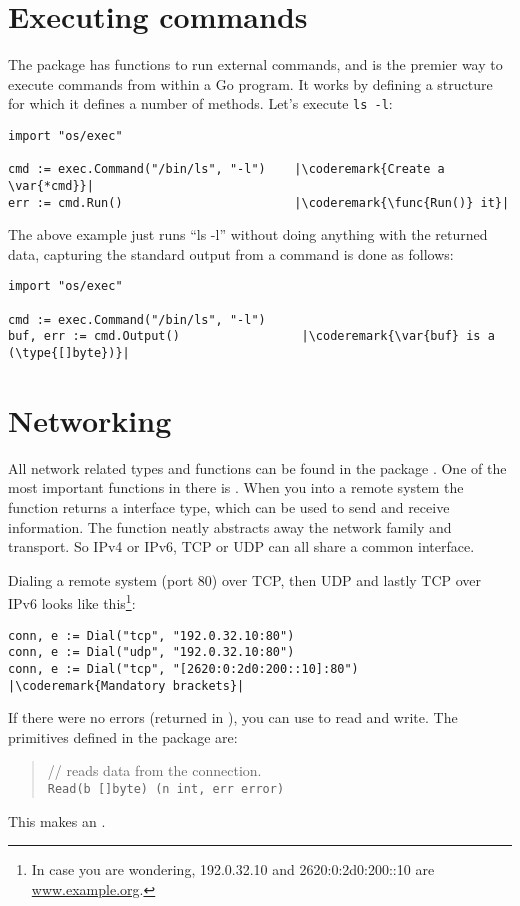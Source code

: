 \section{Executing commands}
The  package has functions to run external commands, and is the premier way to
execute commands from within a Go program. It works by defining a  structure for which it
defines a number of methods.
Let's execute \verb|ls -l|:
\begin{lstlisting}
import "os/exec"

cmd := exec.Command("/bin/ls", "-l")    |\coderemark{Create a \var{*cmd}}|
err := cmd.Run()                        |\coderemark{\func{Run()} it}|
\end{lstlisting}
The above example just runs ``ls -l'' without doing anything with the returned data,
capturing the standard output from a command is done as follows:
\begin{lstlisting}
import "os/exec"

cmd := exec.Command("/bin/ls", "-l")
buf, err := cmd.Output()                 |\coderemark{\var{buf} is a (\type{[]byte})}|
\end{lstlisting}

\section{Networking}
All network related types and functions can be found in the package . One of the
most important functions in there is . When you 
into a remote system the function returns a  interface type, which can be used
to send and receive information. The function  neatly abstracts away the network
family and transport. So IPv4 or IPv6, TCP or UDP can all share a common interface. 

Dialing a remote system (port 80) over TCP, then UDP and lastly TCP over IPv6 looks
like this\footnote{In case
you are wondering, 192.0.32.10 and 2620:0:2d0:200::10 are \url{www.example.org}.}:
\begin{lstlisting}
conn, e := Dial("tcp", "192.0.32.10:80")
conn, e := Dial("udp", "192.0.32.10:80")
conn, e := Dial("tcp", "[2620:0:2d0:200::10]:80") |\coderemark{Mandatory brackets}|
\end{lstlisting}

If there were no errors (returned in ), you can use  to read and write.
The primitives defined in the package  are:
\begin{quote}
//  reads data from the connection.\\
\lstinline{Read(b []byte) (n int, err error)}
\end{quote}
This makes  an .

